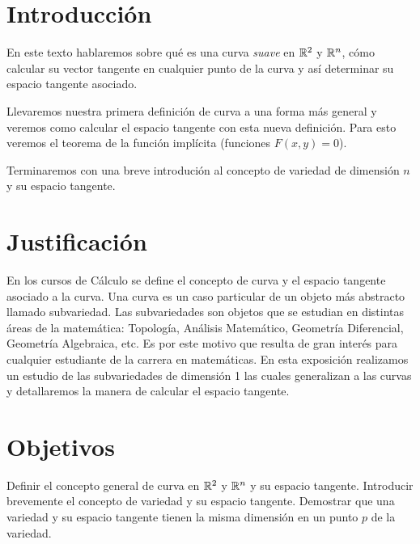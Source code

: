 \section{Introducción}
En este texto hablaremos sobre qué es una curva \emph{suave} en $\mathbb{R}^{2}$ y $\mathbb{R}^{n}$, cómo calcular su vector tangente en cualquier punto de la curva y así determinar
su espacio tangente asociado.

Llevaremos nuestra primera definición de curva a una forma más general y veremos como calcular el espacio tangente con esta nueva definición. Para esto veremos el teorema
de la función implícita (funciones $F(x,y)=0$).

Terminaremos con una breve introdución al concepto de variedad de dimensi\'on $n$ y su espacio tangente.
\section{Justificación}
En los cursos de Cálculo se define el concepto de curva y el espacio tangente asociado a la curva. Una curva es un caso particular de un objeto más abstracto llamado subvariedad. Las subvariedades son objetos que se estudian en distintas áreas de la matemática: Topología, Análisis Matemático, Geometría Diferencial, Geometría Algebraica, etc. Es por este motivo que resulta de gran interés para cualquier estudiante de la carrera en matemáticas. En esta exposición realizamos un estudio de las subvariedades de dimensión 1 las cuales generalizan a las curvas y detallaremos la manera de calcular el espacio tangente.

\section{Objetivos}
Definir el concepto general de curva en $\mathbb{R}^{2}$ y $\mathbb{R}^{n}$ y su espacio tangente. Introducir brevemente el concepto de variedad y su espacio tangente. Demostrar que una variedad y su espacio tangente tienen la misma dimensi\'on en un punto $p$ de la variedad.

